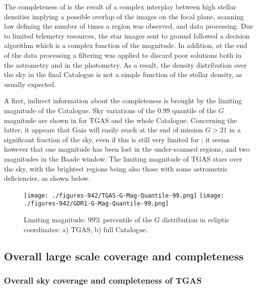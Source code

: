 The completeness of {} is the result of a complex interplay between high stellar densities implying a possible overlap of the images on the focal plane, scanning law defining the number of times a region was observed, and data processing. Due to limited telemetry resources, the star images sent to ground followed a decision algorithm which is a complex function of the magnitude. In addition, at the end of the data processing a filtering was applied to discard poor solutions both in the astrometry and in the photometry. As a result, the density distribution over the sky in the final Catalogue is not a simple function of the stellar density, as usually expected. 

A first, indirect information about the completeness is brought by the limiting magnitude 
of the Catalogue. Sky variations of the 0.99 quantile of the $G$ magnitude are
shown in  for TGAS and the whole Catalogue. Concerning the latter,
it appears that Gaia will easily reach at the end of mission  $G>21$  
in a significant fraction of the sky, even if this is still very limited for {}; 
it seems however that one magnitude has been 
lost in the under-scanned regions, and two magnitudes in the Baade window. 
The limiting magnitude of TGAS stars  over the sky,
with the brightest regions being also those with some astrometric deficiencies,
as shown below.

\begin{figure}
\centering
\texttt{[image: ./figures-942/TGAS-G-Mag-Quantile-99.png]}
\texttt{[image: ./figures-942/GDR1-G-Mag-Quantile-99.png]}
\caption{Limiting magnitude: 99\% percentile of the $G$ distribution in ecliptic coordinates: 
a) TGAS, b) full Catalogue.}
\label{fig:942_limitmag}
\end{figure}



\subsection{Overall large scale coverage and completeness} \label{sec:sky-coverage}

\subsubsection{Overall sky coverage and completeness of TGAS}


